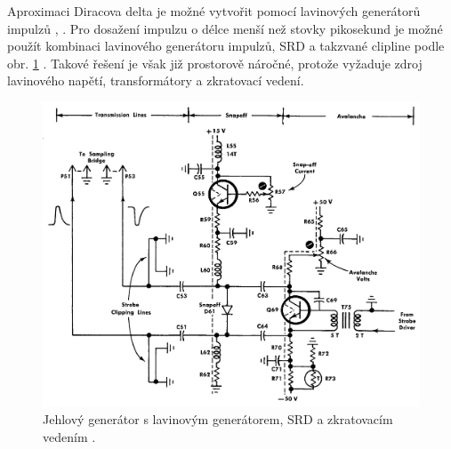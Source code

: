 \begin{itemize}
	Aproximaci Diracova delta je možné vytvořit pomocí lavinových generátorů impulzů \cite{AN72LT}, \cite{AN94LT}. Pro dosažení impulzu o délce menší než stovky pikosekund je možné použít kombinaci lavinového generátoru impulzů, \acrfull{SRD} a takzvané \gls{clipline} podle obr. \ref{clipline_generator} \cite{S-4manual} \cite{S-1manual}. Takové řešení je však již prostorově náročné, protože vyžaduje zdroj lavinového napětí, transformátory a zkratovací vedení.
	
	\begin{figure}[htbp]\includegraphics[width=\textwidth,keepaspectratio]{images/clipline_generator.png}\caption{Jehlový generátor s lavinovým generátorem, \acrshort{SRD} a zkratovacím vedením \cite{S-1manual}.}\label{clipline_generator}\end{figure}			
	

\end{itemize}
